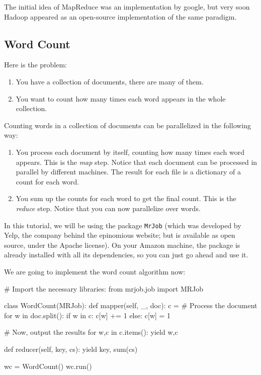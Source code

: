 The initial idea of MapReduce was an implementation by google, but very soon
Hadoop appeared as an open-source implementation of the same paradigm.

\subsection{Word Count}

Here is the problem:

\begin{enumerate}
\item You have a collection of documents, there are many of them.
\item You want to count how many times each word appears in the whole collection.
\end{enumerate}

Counting words in a collection of documents can be parallelized in the following way:

\begin{enumerate}
\item You process each document by itself, counting how many times each word
appears. This is the \emph{map} step. Notice that each document can be
processed in parallel by different machines. The result for each file is a
dictionary of a count for each word.
\item You sum up the counts for each word to get the final count. This is the
\emph{reduce} step. Notice that you can now parallelize over words.
\end{enumerate}

In this tutorial, we will be using the package \texttt{MrJob} (which was
developed by Yelp, the company behind the epinomious website; but is available
as open source, under the Apache license). On your Amazon machine, the package
is already installed with all its dependencies, so you can just go ahead and
use it.

We are going to implement the word count algorithm now:

\begin{python}
# Import the necessary libraries:
from mrjob.job import MRJob

class WordCount(MRJob):
    def mapper(self, _, doc):
        c = {}
        # Process the document
        for w in doc.split():
            if w in c:
                c[w] += 1
            else:
                c[w] = 1

        # Now, output the results
        for w,c in c.items():
            yield w,c

    def reducer(self, key, cs):
        yield key, sum(cs)

wc = WordCount()
wc.run()
\end{python}

